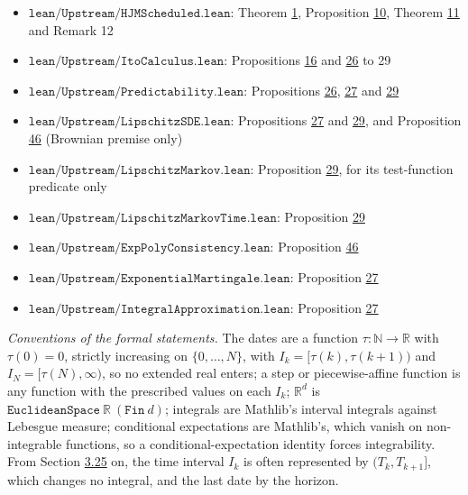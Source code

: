 \documentclass[11pt]{article}
\begin{document}
\begin{itemize}
  \item \(\texttt{lean/Upstream/HJMScheduled.lean}\): Theorem \hyperref[res:Theorem-1]{1}, Proposition \hyperref[res:Proposition-10]{10}, Theorem \hyperref[res:Theorem-11]{11} and Remark 12
  \item \(\texttt{lean/Upstream/ItoCalculus.lean}\): Propositions \hyperref[res:Proposition-16]{16} and \hyperref[res:Proposition-26]{26} to 29
  \item \(\texttt{lean/Upstream/Predictability.lean}\): Propositions \hyperref[res:Proposition-26]{26}, \hyperref[res:Proposition-27]{27} and \hyperref[res:Proposition-29]{29}
  \item \(\texttt{lean/Upstream/LipschitzSDE.lean}\): Propositions \hyperref[res:Proposition-27]{27} and \hyperref[res:Proposition-29]{29}, and Proposition \hyperref[res:Proposition-46]{46} (Brownian premise only)
  \item \(\texttt{lean/Upstream/LipschitzMarkov.lean}\): Proposition \hyperref[res:Proposition-29]{29}, for its test-function predicate only
  \item \(\texttt{lean/Upstream/LipschitzMarkovTime.lean}\): Proposition \hyperref[res:Proposition-29]{29}
  \item \(\texttt{lean/Upstream/ExpPolyConsistency.lean}\): Proposition \hyperref[res:Proposition-46]{46}
  \item \(\texttt{lean/Upstream/ExponentialMartingale.lean}\): Proposition \hyperref[res:Proposition-27]{27}
  \item \(\texttt{lean/Upstream/IntegralApproximation.lean}\): Proposition \hyperref[res:Proposition-27]{27}
\end{itemize}

\emph{Conventions of the formal statements.} The dates are a function \(\tau:\mathbb N\to\mathbb R\) with \(\tau(0)=0\), strictly increasing on \(\{0,\dots,N\}\), with \(I_k=[\tau(k),\tau(k+1))\) and \(I_N=[\tau(N),\infty)\), so no extended real enters; a step or piecewise-affine function is any function with the prescribed values on each \(I_k\); \(\mathbb R^d\) is \(\texttt{EuclideanSpace}\ \mathbb R\ (\texttt{Fin}\ d)\); integrals are Mathlib's interval integrals against Lebesgue measure; conditional expectations are Mathlib's, which vanish on non-integrable functions, so a conditional-expectation identity forces integrability. From Section \hyperref[sec:3.25]{3.25} on, the time interval \(I_k\) is often represented by \((T_k,T_{k+1}]\), which changes no integral, and the last date by the horizon.
\end{document}

